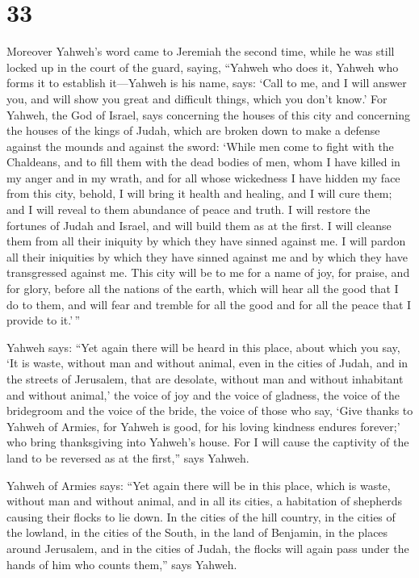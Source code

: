 \hypertarget{section-32}{%
\section{33}\label{section-32}}

 Moreover Yahweh's word came to Jeremiah the second time,
while he was still locked up in the court of the guard, saying,
 ``Yahweh who does it, Yahweh who forms it to establish
it---Yahweh is his name, says:  `Call to me, and I will
answer you, and will show you great and difficult things, which you
don't know.'  For Yahweh, the God of Israel, says
concerning the houses of this city and concerning the houses of the
kings of Judah, which are broken down to make a defense against the
mounds and against the sword:  `While men come to fight
with the Chaldeans, and to fill them with the dead bodies of men, whom I
have killed in my anger and in my wrath, and for all whose wickedness I
have hidden my face from this city,  behold, I will bring
it health and healing, and I will cure them; and I will reveal to them
abundance of peace and truth.  I will restore the fortunes
of Judah and Israel, and will build them as at the first. 
I will cleanse them from all their iniquity by which they have sinned
against me. I will pardon all their iniquities by which they have sinned
against me and by which they have transgressed against me.
 This city will be to me for a name of joy, for praise,
and for glory, before all the nations of the earth, which will hear all
the good that I do to them, and will fear and tremble for all the good
and for all the peace that I provide to it.'\,''

 Yahweh says: ``Yet again there will be heard in this
place, about which you say, `It is waste, without man and without
animal, even in the cities of Judah, and in the streets of Jerusalem,
that are desolate, without man and without inhabitant and without
animal,'  the voice of joy and the voice of gladness, the
voice of the bridegroom and the voice of the bride, the voice of those
who say, `Give thanks to Yahweh of Armies, for Yahweh is good, for his
loving kindness endures forever;' who bring thanksgiving into Yahweh's
house. For I will cause the captivity of the land to be reversed as at
the first,'' says Yahweh.

 Yahweh of Armies says: ``Yet again there will be in this
place, which is waste, without man and without animal, and in all its
cities, a habitation of shepherds causing their flocks to lie down.
 In the cities of the hill country, in the cities of the
lowland, in the cities of the South, in the land of Benjamin, in the
places around Jerusalem, and in the cities of Judah, the flocks will
again pass under the hands of him who counts them,'' says Yahweh.

